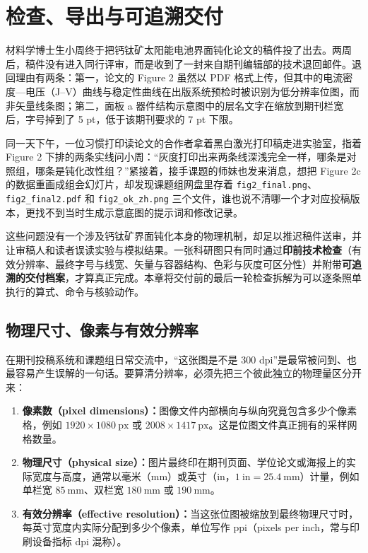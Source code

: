 \chapter{检查、导出与可追溯交付}

材料学博士生小周终于把钙钛矿太阳能电池界面钝化论文的稿件投了出去。两周后，稿件没有进入同行评审，而是收到了一封来自期刊编辑部的技术退回邮件。退回理由有两条：第一，论文的 Figure 2 虽然以 PDF 格式上传，但其中的电流密度—电压（J–V）曲线与稳定性曲线在出版系统预检时被识别为低分辨率位图，而非矢量线条图；第二，面板 a 器件结构示意图中的层名文字在缩放到期刊栏宽后，字号掉到了 5 pt，低于该期刊要求的 7 pt 下限。

同一天下午，一位习惯打印读论文的合作者拿着黑白激光打印稿走进实验室，指着 Figure 2 下排的两条实线问小周：“灰度打印出来两条线深浅完全一样，哪条是对照组，哪条是钝化改性组？”紧接着，接手课题的师妹也发来消息，想把 Figure 2c 的数据重画成组会幻灯片，却发现课题组网盘里存着 \texttt{fig2\_final.png}、\texttt{fig2\_final2.pdf} 和 \texttt{fig2\_ok\_zh.png} 三个文件，谁也说不清哪一个才对应投稿版本，更找不到当时生成示意底图的提示词和修改记录。

这些问题没有一个涉及钙钛矿界面钝化本身的物理机制，却足以推迟稿件送审，并让审稿人和读者误读实验与模拟结果。一张科研图只有同时通过\textbf{印前技术检查}（有效分辨率、最终字号与线宽、矢量与容器结构、色彩与灰度可区分性）并附带\textbf{可追溯的交付档案}，才算真正完成。本章将交付前的最后一轮检查拆解为可以逐条照单执行的算式、命令与核验动作。

\section{物理尺寸、像素与有效分辨率}

在期刊投稿系统和课题组日常交流中，“这张图是不是 300 dpi”是最常被问到、也最容易产生误解的一句话。要算清分辨率，必须先把三个彼此独立的物理量区分开来：

\begin{enumerate}
\item \textbf{像素数（pixel dimensions）：}图像文件内部横向与纵向究竟包含多少个像素格，例如 $1920 \times 1080\ \text{px}$ 或 $2008 \times 1417\ \text{px}$。这是位图文件真正拥有的采样网格数量。
\item \textbf{物理尺寸（physical size）：}图片最终印在期刊页面、学位论文或海报上的实际宽度与高度，通常以毫米（mm）或英寸（$\text{in}$，$1\ \text{in} = 25.4\ \text{mm}$）计量，例如单栏宽 $85\ \text{mm}$、双栏宽 $180\ \text{mm}$ 或 $190\ \text{mm}$。
\item \textbf{有效分辨率（effective resolution）：}当这张位图被缩放到最终物理尺寸时，每英寸宽度内实际分配到多少个像素，单位写作 ppi（pixels per inch，常与印刷设备指标 dpi 混称）。
\end{enumerate}

